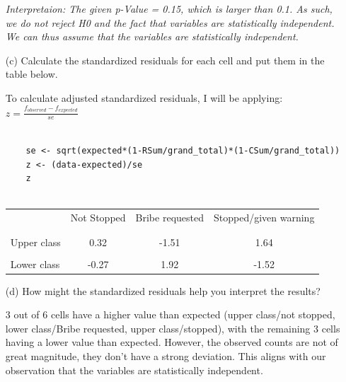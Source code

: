 \documentclass[12pt,letterpaper]{article}
\begin{document}
\begin{enumerate}
\textit{Interpretaion: 	The given p-Value = 0.15, which is larger than 0.1. As such, we do not reject H0 and the fact that variables are statistically independent. We can thus assume that the variables are statistically independent. }
	
	\item [(c)] Calculate the standardized residuals for each cell and put them in the table below.
	\vspace{1cm}
	
	To calculate adjusted standardized residuals, I will be applying:
	 $z =\frac{f_{observed}-f_{expected}}{se}$
	
	\begin{BVerbatim}
		
	se <- sqrt(expected*(1-RSum/grand_total)*(1-CSum/grand_total))
	z <- (data-expected)/se
	z
	
	\end{BVerbatim}

	\begin{table}[h]
		\centering
		\begin{tabular}{l | c c c }
			& Not Stopped & Bribe requested & Stopped/given warning \\
			\\[-1.8ex] 
			\hline \\[-1.8ex]
			Upper class  & 0.32  &   -1.51  & 1.64 \\
			\\
			Lower class &  -0.27 &  1.92 &   -1.52 \\
			
		\end{tabular}
	\end{table}
	
	
	\vspace{3cm}
	\item [(d)] How might the standardized residuals help you interpret the results?  
	
	 3 out of 6 cells have a higher value than expected (upper class/not stopped, lower class/Bribe requested, upper class/stopped), with the remaining 3 cells having a lower value than expected. However, the observed counts are not of great magnitude, they don't have a strong deviation. This aligns with our observation that the variables are statistically independent. 
	
	
\end{enumerate}
\newpage
\end{document}
